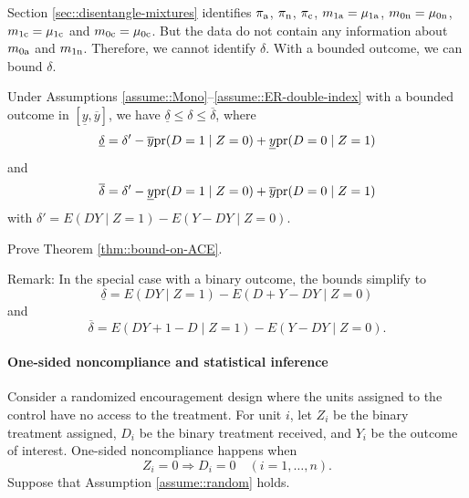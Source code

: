 Section \ref{sec::disentangle-mixtures} identifies $\pi_{\textup{a}}$, $\pi_{\textup{n}}$, $\pi_{\textup{c}}$, $m_{1\textup{a}} = \mu_{1 \textup{a}}$, $m_{0\textup{n}} = \mu_{0\textup{n} }$, $m_{1\textup{c}} = \mu_{1\textup{c}}$ and $m_{0\textup{c}} = \mu_{0\textup{c}}$. But the data do not contain any information about $m_{0 \textup{a}}$ and $m_{1\textup{n} }$. Therefore, we cannot identify $\delta$. With a bounded outcome, we can bound $\delta$.  

\begin{theorem}
\label{thm::bound-on-ACE}
Under Assumptions \ref{assume::Mono}--\ref{assume::ER-double-index} with a bounded outcome in $[\underline{y}, \overline{y}]$, we have $\underline{\delta} \leq  \delta  \leq \overline{\delta}$, where
$$
\underline{\delta} =  \delta'  - \overline{y} \textup{pr}(D=1\mid Z=0) + \underline{y} \textup{pr}(D=0\mid Z=1)
$$
and
$$
\overline{\delta} = \delta'  -   \underline{y} \textup{pr}(D=1\mid Z=0) +  \overline{y}  \textup{pr}(D=0\mid Z=1) 
$$
with $\delta' = E(DY\mid Z=1) - E(Y-DY\mid Z=0) .$
\end{theorem}

Prove Theorem  \ref{thm::bound-on-ACE}. 
 
 
Remark: In the special case with a binary outcome, the bounds simplify to 
 $$
\underline{\delta} =   E(DY\mid Z=1) - E( D+Y-DY\mid Z=0)  
$$
and
$$
\overline{\delta} =  E(DY+1-D\mid Z=1) - E(Y-DY\mid Z=0) .
 $$
 
 
 \paragraph{One-sided noncompliance and statistical inference}\label{para::15-onesidednoncompliance}
 
Consider a randomized encouragement design where the units assigned to the control have no access to the treatment. For unit $i$, let $Z_i$ be the binary treatment assigned, $D_i$ be the binary treatment received, and $Y_i$ be the outcome of interest. One-sided noncompliance happens when 
$$
Z_i=0 \Longrightarrow  D_i = 0 \quad (i=1,\ldots, n). 
$$
Suppose that Assumption \ref{assume::random} holds. 
 
